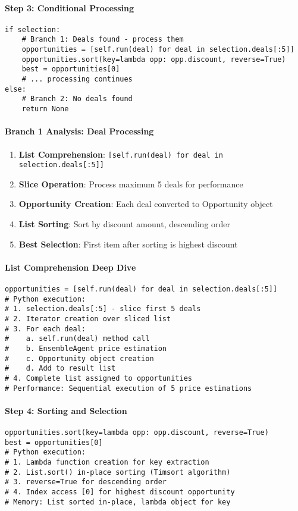 \paragraph{Step 3: Conditional Processing}
\begin{lstlisting}[caption=Deal Processing Branch]
if selection:
    # Branch 1: Deals found - process them
    opportunities = [self.run(deal) for deal in selection.deals[:5]]
    opportunities.sort(key=lambda opp: opp.discount, reverse=True)
    best = opportunities[0]
    # ... processing continues
else:
    # Branch 2: No deals found
    return None
\end{lstlisting}

\paragraph{Branch 1 Analysis: Deal Processing}
\begin{enumerate}
\item \textbf{List Comprehension}: \texttt{[self.run(deal) for deal in selection.deals[:5]]}
\item \textbf{Slice Operation}: Process maximum 5 deals for performance
\item \textbf{Opportunity Creation}: Each deal converted to Opportunity object
\item \textbf{List Sorting}: Sort by discount amount, descending order
\item \textbf{Best Selection}: First item after sorting is highest discount
\end{enumerate}

\paragraph{List Comprehension Deep Dive}
\begin{lstlisting}[caption=List Comprehension Execution]
opportunities = [self.run(deal) for deal in selection.deals[:5]]
# Python execution:
# 1. selection.deals[:5] - slice first 5 deals
# 2. Iterator creation over sliced list
# 3. For each deal:
#    a. self.run(deal) method call
#    b. EnsembleAgent price estimation
#    c. Opportunity object creation
#    d. Add to result list
# 4. Complete list assigned to opportunities
# Performance: Sequential execution of 5 price estimations
\end{lstlisting}

\paragraph{Step 4: Sorting and Selection}
\begin{lstlisting}[caption=Opportunity Ranking]
opportunities.sort(key=lambda opp: opp.discount, reverse=True)
best = opportunities[0]
# Python execution:
# 1. Lambda function creation for key extraction
# 2. List.sort() in-place sorting (Timsort algorithm)
# 3. reverse=True for descending order
# 4. Index access [0] for highest discount opportunity
# Memory: List sorted in-place, lambda object for key
\end{lstlisting}

